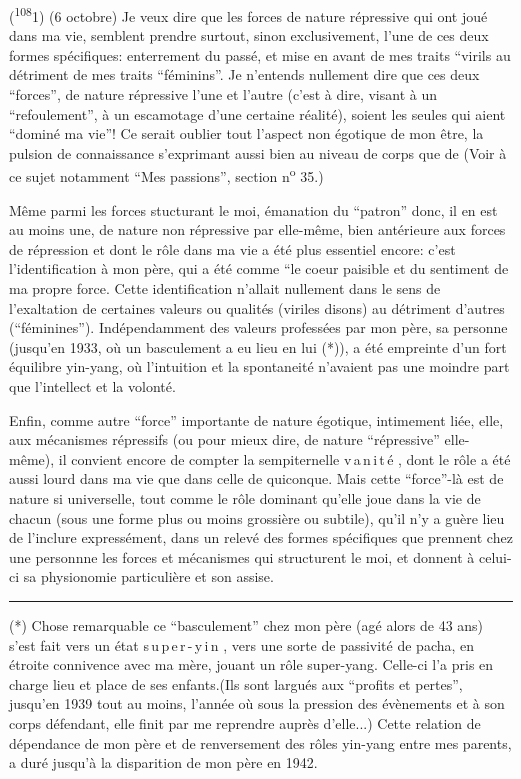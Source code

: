 
(\textsuperscript{108}1) (6 octobre) Je veux dire que les forces de nature répressive qui ont joué dans ma vie, semblent prendre surtout, sinon exclusivement, l'une de ces deux formes spécifiques: enterrement du passé, et mise en avant de mes traits ``virils au détriment de mes traits ``féminins''. Je n'entends nullement dire que ces deux ``forces'', de nature répressive l'une et l'autre (c'est à dire, visant à un ``refoulement'', à un escamotage d'une certaine réalité), soient les seules qui aient ``dominé ma vie''! Ce serait oublier tout l'aspect non égotique de mon être, la pulsion de connaissance s'exprimant aussi bien au niveau de corps que de  (Voir à ce sujet notamment ``Mes passions'', section n\textsuperscript{o} 35.)

Même parmi les forces stucturant le moi, émanation du ``patron'' donc, il en est au moins une, de nature non répressive par elle-même, bien antérieure aux forces de répression et dont le rôle dans ma vie a été plus essentiel encore: c'est l'identification à mon père, qui a été comme ``le coeur paisible et  du sentiment de ma propre force. Cette identification n'allait nullement dans le sens de l'exaltation de certaines valeurs ou qualités (viriles disons) au détriment d'autres (``féminines''). Indépendamment des valeurs professées par mon père, sa personne (jusqu'en 1933, où un basculement a eu lieu en lui (*)), a été empreinte d'un fort équilibre yin-yang, où l'intuition et la spontaneité n'avaient pas une moindre part que l'intellect et la volonté.

Enfin, comme autre ``force'' importante de nature égotique, intimement liée, elle, aux mécanismes répressifs (ou pour mieux dire, de nature ``répressive'' elle-même), il convient encore de compter la sempiternelle v\,a\,n\,i\,t\,é , dont le rôle a été aussi lourd dans ma vie que dans celle de quiconque. Mais cette ``force''-là est de nature si universelle, tout comme le rôle dominant qu'elle joue dans la vie de chacun (sous une forme plus ou moins grossière ou subtile), qu'il n'y a guère lieu de l'inclure expressément, dans un relevé des formes spécifiques que prennent chez une personnne les forces et mécanismes qui structurent le moi, et donnent à celui-ci sa physionomie particulière et son assise.

\noindent\rule{5em}{0.3pt}\par
(*) Chose remarquable\handwritten{,} ce ``basculement'' chez mon père (agé alors de 43 ans) s'est fait vers un état s\,u\,p\,e\,r\,-\,y\,i\,n , vers une sorte de passivité de pacha, en étroite connivence avec ma mère, jouant un rôle super-yang. Celle-ci l'a pris en charge \hspace{1em} lieu et place de ses enfants.(Ils sont largués aux ``profits et pertes'', jusqu'en 1939 tout au moins, l'année où sous la pression des évènements et à son corps défendant, elle finit par me reprendre auprès d'elle...) Cette relation de dépendance de mon père et de renversement des rôles yin-yang entre mes parents, a duré jusqu'à la disparition de mon père en 1942.
